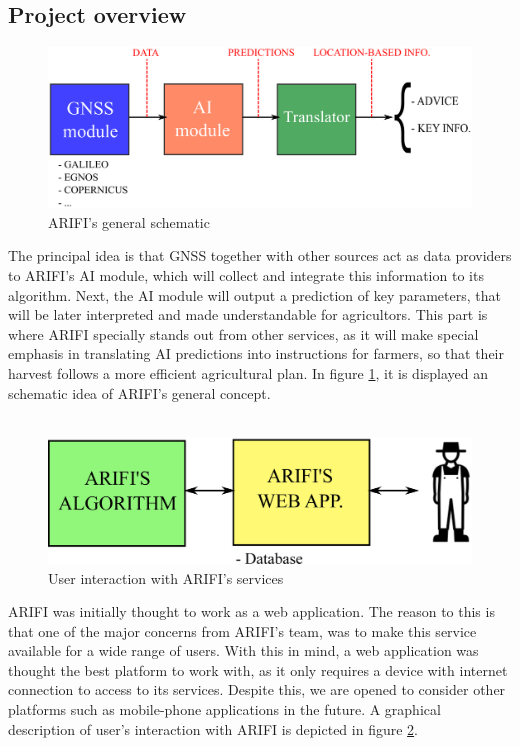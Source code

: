 \subsection{Project overview}
%
\begin{figure}[b!]
    \centering
    \includegraphics[scale= 0.26]{images/dibujo1.eps}
    \caption{ARIFI's general schematic}
    \label{fig:sch1}
\end{figure}
%
The principal idea is that GNSS together with other sources act as data providers to ARIFI's AI module, which will collect and integrate this information to its algorithm. Next, the AI module will output a prediction of key parameters, that will be later interpreted and made understandable for agricultors. This part is where ARIFI specially stands out from other services, as it will make special emphasis in translating AI predictions into instructions for farmers, so that their harvest follows a more efficient agricultural plan. In figure \ref{fig:sch1}, it is displayed an schematic idea of ARIFI's general concept.\\\\
%
\begin{figure}[t!]
    \centering
    \includegraphics[scale= 0.15]{images/dibujo2.eps}
    \caption{User interaction with ARIFI's services}
    \label{fig:sch2}
\end{figure}
%
ARIFI was initially thought to work as a web application. The reason to this is that one of the major concerns from ARIFI's team, was to make this service available for a wide range of users. With this in mind, a web application was thought the best platform to work with, as it only requires a device with internet connection to access to its services. Despite this, we are opened to consider other platforms such as mobile-phone applications in the future. A graphical description of user's interaction with ARIFI is depicted in figure \ref{fig:sch2}.
